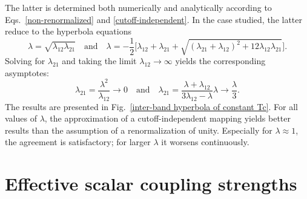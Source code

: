 The latter is determined both numerically and analytically according to
Eqs.~\ref{non-renormalized} and \ref{cutoff-independent}. In the case studied,
the latter reduce to the hyperbola equations
%
\begin{equation*}
    \lambda = \sqrt{\lambda_{1 2} \lambda_{2 1}}
    \quad \text{and} \quad
    \lambda = -\frac 1 2 \Big[ \lambda_{1 2} + \lambda_{2 1} + \sqrt{
        (\lambda_{2 1} + \lambda_{1 2})^2
        + 12 \lambda_{1 2} \lambda_{2 1}
        }
    \Big].
\end{equation*}
%
Solving for $\lambda_{2 1}$ and taking the limit $\lambda_{1 2} \rightarrow
\infty$ yields the corresponding asymptotes:
%
\begin{equation*}
    \lambda_{2 1} = \frac{\lambda^2}{\lambda_{1 2}} \rightarrow 0
    \quad \text{and} \quad
    \lambda_{2 1} = \frac{\lambda + \lambda_{1 2}}{3 \lambda_{1 2} - \lambda}
    \lambda \rightarrow \frac \lambda 3.
\end{equation*}
%
The results are presented in Fig.~\ref{inter-band hyperbola of constant Tc}. For
all values of $\lambda$, the approximation of a cutoff-independent mapping
yields better results than the assumption of a renormalization of unity.
Especially for $\lambda \approx 1$, the agreement is satisfactory; for larger
$\lambda$ it worsens continuously.

\section{Effective scalar coupling strengths}

